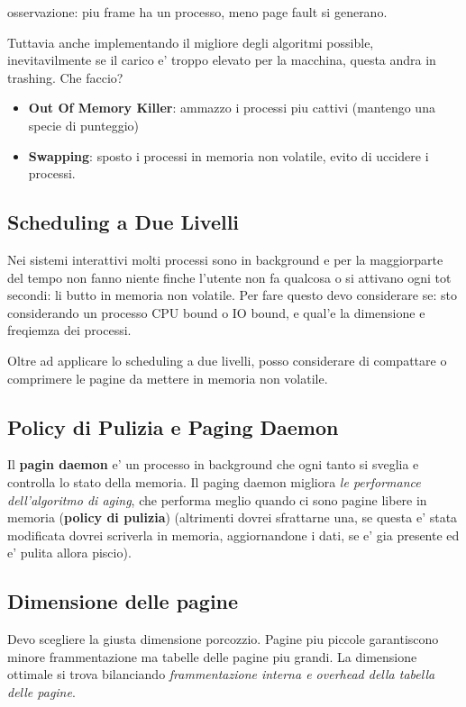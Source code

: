 osservazione: piu frame ha un processo, meno page fault si generano.

Tuttavia anche implementando il migliore degli algoritmi possible, inevitavilmente se il carico
e' troppo elevato per la macchina, questa andra in trashing. Che faccio?
\begin{itemize}
    \item \textbf{Out Of Memory Killer}: ammazzo i processi piu cattivi (mantengo una specie di punteggio)
    \item \textbf{Swapping}: sposto i processi in memoria non volatile, evito di uccidere i processi.
\end{itemize}

\subsection{Scheduling a Due Livelli}
Nei sistemi interattivi molti processi sono in background e per la maggiorparte del tempo non fanno niente finche
l'utente non fa qualcosa o si attivano ogni tot secondi: li butto in memoria non volatile.
Per fare questo devo considerare se: sto considerando un processo CPU bound o IO bound, e qual'e la dimensione e freqiemza dei processi.

Oltre ad applicare lo scheduling a due livelli, posso considerare di compattare o comprimere le pagine da mettere in memoria non volatile. 

\subsection{Policy di Pulizia e Paging Daemon}
Il \textbf{pagin daemon} e' un processo in background che ogni tanto si sveglia e controlla
lo stato della memoria. Il paging daemon migliora \textit{le performance dell'algoritmo di aging}, che performa 
meglio quando ci sono pagine libere in memoria (\textbf{policy di pulizia}) (altrimenti dovrei sfrattarne una, se questa e' stata modificata dovrei scriverla in memoria,
aggiornandone i dati, se e' gia presente ed e' pulita allora piscio). 

\subsection{Dimensione delle pagine}
Devo scegliere la giusta dimensione porcozzio. Pagine piu piccole garantiscono minore frammentazione ma tabelle
delle pagine piu grandi. La dimensione ottimale si trova bilanciando \textit{frammentazione interna e overhead della tabella
delle pagine}.

